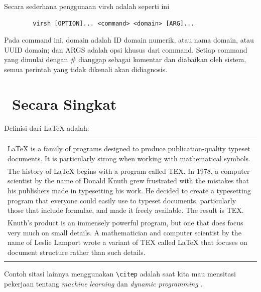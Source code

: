 Secara sederhana penggunaan virsh adalah seperti ini
\begin{center}
	\begin{verbatim}
		virsh [OPTION]... <command> <domain> [ARG]...
	\end{verbatim}
\end{center}

Pada command ini, domain adalah ID domain numerik, atau nama domain, atau UUID domain; dan ARGS adalah opsi khusus dari command. Setiap command yang dimulai dengan \# dianggap sebagai komentar dan diabaikan oleh sistem, semua perintah yang tidak dikenali akan didiagnosis.

\iffalse
\section{\latex~Secara Singkat}
Definisi dari LaTeX \citep{lankton2008introduction} adalah: \\ 
\begin{tabular}{| p{13cm} |}
	\hline 
	\\
	LaTeX is a family of programs designed to produce publication-quality 
	typeset documents. It is particularly strong when working with 
	mathematical symbols. \\	
	The history of LaTeX begins with a program called TEX. In 1978, a 
	computer scientist by the name of Donald Knuth grew frustrated with the 
	mistakes that his publishers made in typesetting his work. He decided 
	to create a typesetting program that everyone could easily use to 
	typeset documents, particularly those that include formulae, and made 
	it freely available. The result is TEX. \\	
	Knuth's product is an immensely powerful program, but one that does 
	focus very much on small details. A mathematician and computer 
	scientist by the name of Leslie Lamport wrote a variant of TEX called 
	LaTeX that focuses on document structure rather than such details. \\
	\\
	\hline
\end{tabular}

\vspace*{0.8cm}

Contoh sitasi lainnya menggunakan \verb|\citep| adalah saat kita mau mensitasi pekerjaan tentang \textit{machine learning} \citep{chin2000learning} dan \textit{dynamic programming} \citep{barto1995learning}. \\


